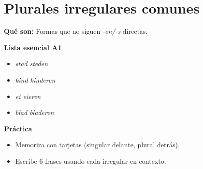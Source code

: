 \section{Plurales irregulares comunes}
\textbf{Qué son:} Formas que no siguen \textit{-en/-s} directas.

\textbf{Lista esencial A1}
\begin{itemize}[leftmargin=*]
  \item \textit{stad \textrightarrow{} steden}
  \item \textit{kind \textrightarrow{} kinderen}
  \item \textit{ei \textrightarrow{} eieren}
  \item \textit{blad \textrightarrow{} bladeren}
\end{itemize}

\textbf{Práctica}
\begin{itemize}[leftmargin=*]
  \item Memoriza con tarjetas (singular delante, plural detrás).
  \item Escribe 6 frases usando cada irregular en contexto.
\end{itemize}

